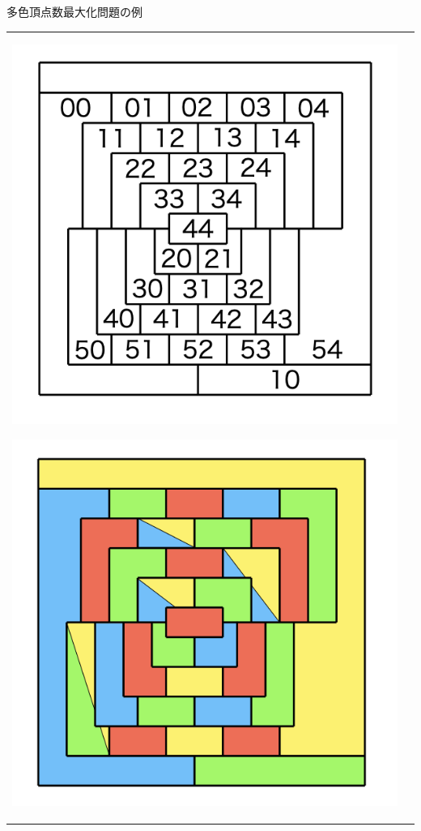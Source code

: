 \documentclass[dvipdfmx,11pt]{beamer}
\begin{document}

\begin{frame}{多色頂点数最大化問題の例}
\begin{tabular}{cc}
 \begin{minipage}[t]{0.5\linewidth}
  \centering
  \includegraphics[scale=0.2]{fig/order5.png}
 \end{minipage}
 \begin{minipage}[t]{0.5\linewidth}
  \centering
  \includegraphics[scale=0.2]{fig/order5_mult.png}
 \end{minipage}
\end{tabular}


\end{frame}
\end{document}
